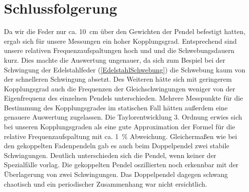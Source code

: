 \documentclass[
	a4paper,
	12pt,
	pagesize,
	ngerman
]{scrartcl}
\begin{document}
	\section{Schlussfolgerung}
	Da wir die Feder nur ca. \SI{10}{cm} über den Gewichten der Pendel befestigt hatten, ergab sich für unsere Messungen ein hoher Kopplungsgrad. Entsprechend sind unsere relativen Frequenzaufspaltungen hoch und und die Schwebungsdauern kurz.  Dies machte die Auswertung ungenauer, da sich zum Bespiel bei der Schwingung der Edelstahlfeder (\cref{EdelstahlSchwebung}) die Schwebung kaum von der schnelleren Schwingung absetzt. Des Weiteren hätte sich mit geringerem Kopplungsgrad auch die Frequenzen der Gleichschwingungen weniger von der Eigenfrequenz des einzelnen Pendels unterschieden.
	Mehrere Messpunkte für die Bestimmung des Kopplungsgrades im statischen Fall hätten außerdem eine genauere Auswertung zugelassen.
	Die Taylorentwicklung 3. Ordnung erwies sich bei unseren Kopplungsgraden als eine gute Approximation der Formel für die relative Frequenzaufspaltung mit ca. \SI{1}{\%} Abweichung.
	Gleichermaßen wie bei den gekoppelten Fadenpendeln gab es auch beim Doppelpendel zwei stabile Schwingungen. Deutlich unterschieden sich die Pendel, wenn keiner der Spezialfälle vorlag. Die gekoppelten Pendel oszillierten noch erkennbar mit der Überlagerung von zwei Schwingungen. Das Doppelpendel dagegen schwang chaotisch und ein periodischer Zusammenhang war nicht ersichtlich.
	
\end{document}
